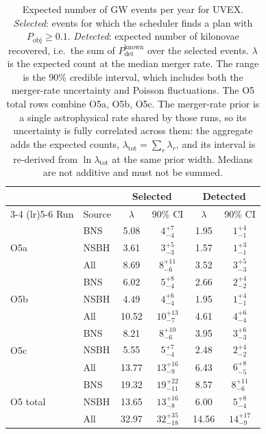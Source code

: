 \begin{table}[!htb]
\centering
\renewcommand\arraystretch{1.15}
\setlength{\tabcolsep}{0.22cm}
\caption{Expected number of GW events per year for UVEX. \emph{Selected}: events for which the scheduler finds a plan with $P_\mathrm{obj} \geq 0.1$. \emph{Detected}: expected number of kilonovae recovered, i.e.\ the sum of $P_\mathrm{det}^\mathrm{known}$ over the selected events. $\lambda$ is the expected count at the median merger rate. The range is the 90\% credible interval, which includes both the merger-rate uncertainty and Poisson fluctuations. The O5 total rows combine O5a, O5b, O5c. The merger-rate prior is a single astrophysical rate shared by those runs, so its uncertainty is fully correlated across them: the aggregate adds the expected counts, $\lambda_\mathrm{tot} = \sum_r \lambda_r$, and its interval is re-derived from $\ln \lambda_\mathrm{tot}$ at the same prior width. Medians are not additive and must not be summed.}
\label{tab:uvex-selected-detected-1yr}
\begin{tabular}{llcccc}
\toprule
 & & \multicolumn{2}{c}{Selected} & \multicolumn{2}{c}{Detected} \\
\cmidrule(lr){3-4} \cmidrule(lr){5-6}
Run & Source & $\lambda$ & 90\% CI & $\lambda$ & 90\% CI \\
\midrule
\multirow{3}{*}{O5a} & BNS  & 5.08 & $4^{+7}_{-4}$ & 1.95 & $1^{+4}_{-1}$ \\
                     & NSBH & 3.61 & $3^{+5}_{-3}$ & 1.57 & $1^{+3}_{-1}$ \\
                     & All  & 8.69 & $8^{+11}_{-6}$ & 3.52 & $3^{+5}_{-3}$ \\
\midrule
\multirow{3}{*}{O5b} & BNS  & 6.02 & $5^{+8}_{-4}$ & 2.66 & $2^{+4}_{-2}$ \\
                     & NSBH & 4.49 & $4^{+6}_{-4}$ & 1.95 & $1^{+4}_{-1}$ \\
                     & All  & 10.52 & $10^{+13}_{-7}$ & 4.61 & $4^{+6}_{-4}$ \\
\midrule
\multirow{3}{*}{O5c} & BNS  & 8.21 & $8^{+10}_{-6}$ & 3.95 & $3^{+6}_{-3}$ \\
                     & NSBH & 5.55 & $5^{+7}_{-4}$ & 2.48 & $2^{+4}_{-2}$ \\
                     & All  & 13.77 & $13^{+16}_{-9}$ & 6.43 & $6^{+8}_{-5}$ \\
\midrule
\multirow{3}{*}{O5 total} & BNS  & 19.32 & $19^{+22}_{-11}$ & 8.57 & $8^{+11}_{-6}$ \\
                          & NSBH & 13.65 & $13^{+16}_{-8}$ & 6.00 & $5^{+8}_{-4}$ \\
                          & All  & 32.97 & $32^{+35}_{-18}$ & 14.56 & $14^{+17}_{-9}$ \\
\bottomrule
\end{tabular}
\end{table}
